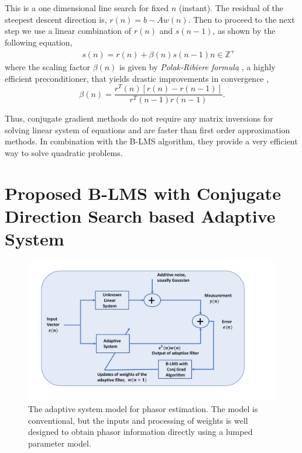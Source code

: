 \documentclass{UCF_ETD}
\begin{document}
This is a one dimensional line search for fixed $n$ (instant). The residual of the steepest descent direction is, $r(n)=b-Aw(n)$. Then to proceed to the next step we use a linear combination of $r(n)$ and $s(n-1)$, as shown by the following equation, 
\begin{eqnarray}\label{PolakEquation}
&&s(n)=r(n)+ \beta(n)s(n-1) n \in \mathbb{Z^+}
\end{eqnarray}
where the scaling factor $\beta(n)$ is given by \emph{Polak-Ribiere formula} \cite{Luigi1997}, a highly efficient preconditioner, that yields drastic improvements in convergence \cite{Haykin1996},
\begin{equation}
\beta (n) = \frac{r^T(n)[r(n)-r(n-1)]}{r^T(n-1)r(n-1)}.
\end{equation}

Thus, conjugate gradient methods do not require any matrix inversions for solving linear system of equations and are faster than first order approximation methods. In combination with the B-LMS algorithm, they provide a very efficient way to solve quadratic problems. 

\section{Proposed B-LMS with Conjugate Direction Search based Adaptive System} \label{ProposedBLMS}
\begin{figure}[H]
\begin{center}
\includegraphics[scale=0.6]{BLMS_Figures/BlockDiagram}
\caption{The adaptive system model for phasor estimation. The model is conventional, but the inputs and processing of weights is well designed to obtain phasor information directly using a lumped parameter model.}
\label{AdaptiveSystemModel}
\end{center}
\end{figure}
\end{document}

